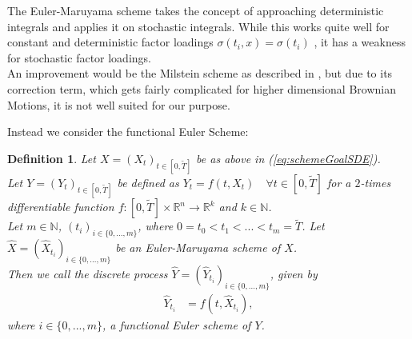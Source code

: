 \documentclass[12pt]{article}
\newtheorem{definition}[theorem]{Definition}
\begin{document}
	The Euler-Maruyama scheme takes the concept of approaching deterministic integrals and applies it on stochastic integrals. While this works quite well for constant and deterministic factor loadings $\sigma(t_i, x) = \sigma(t_i)$ \cite{kloedenSchemes}, it has a weakness for stochastic factor loadings.\\
	An improvement would be the Milstein scheme as described in \cite{kloedenSchemes}, but due to its correction term, which gets fairly complicated for higher dimensional Brownian Motions, it is not well suited for our purpose.

	Instead we consider the functional Euler Scheme:
	\begin{definition}\label{def:funceulerscheme}
		Let $X=(X_t)_{t\in [0,\tilde{T}]}$ be as above in (\ref{eq:schemeGoalSDE}).\\
		Let $Y=(Y_t)_{t\in [0,\tilde{T}]}$ be defined as $Y_t = f(t, X_t) \quad \forall t\in [0,\tilde{T}]$ for a $2$-times differentiable function $f: [0,\tilde{T}] \times \mathbb{R}^n \rightarrow \mathbb{R}^k$ and $k \in \mathbb{N}$.\\
		Let $m \in \mathbb{N}$, $(t_i)_{i\in \{0, ..., m\}}$, where $0=t_0 < t_1 < ... < t_m=\tilde{T}$. Let  $\hat{X} = (\hat{X}_{t_i})_{i \in \{0, ..., m\}}$ be an Euler-Maruyama scheme of $X$.\\
		Then we call the discrete process $\hat{Y} = (\hat{Y}_{t_i})_{i \in \{0, ..., m\}}$, given by
		\begin{align*}
			\hat{Y}_{t_i} &= f(t,\hat{X}_{t_i}),
		\end{align*}
		where $i \in \{0, ..., m\}$, a \emph{functional Euler scheme of $Y$}.
	\end{definition}
\end{document}
